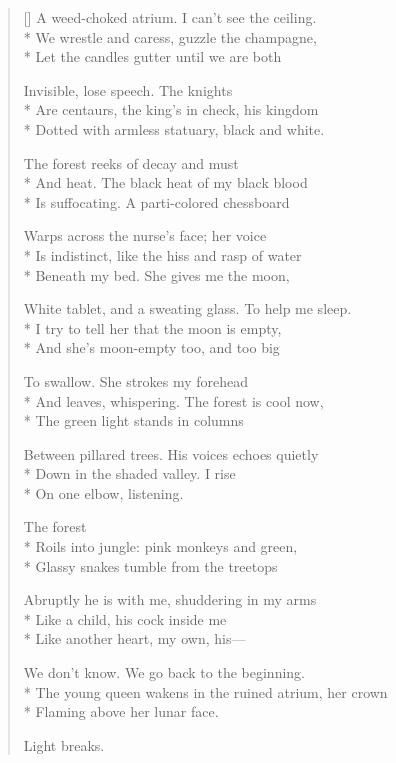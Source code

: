 \begin{verse}[\versewidth]
A weed-choked atrium.  I can't see the ceiling.\\*
We wrestle and caress, guzzle the champagne,\\*
Let the candles gutter until we are both

Invisible, lose speech. The knights\\*
Are centaurs, the king's in check, his kingdom\\*
Dotted with armless statuary, black and white.

The forest reeks of decay and must\\*
And heat. The black heat of my black blood\\*
Is suffocating.  A parti-colored chessboard   

Warps across the nurse's face; her voice\\*
Is indistinct, like the hiss and rasp of water\\*
Beneath my bed.  She gives me the moon,

White tablet, and a sweating glass. To help me sleep.\\*
I try to tell her that the moon is empty,\\*
And she's moon-empty too, and too big

To swallow. She strokes my forehead\\*
And leaves, whispering.  The forest is cool now,\\*
The green light stands in columns

Between pillared trees.  His voices echoes quietly\\*
Down in the shaded valley.  I rise \\*
On one elbow, listening.

\hspace{4\vgap} The forest\\*
Roils into jungle: pink monkeys and green,\\*
Glassy snakes tumble from the treetops

Abruptly he is with me, shuddering in my arms\\*
Like a child, his cock inside me\\*
Like another heart, my own, his---

We don't know.  We go back to the beginning.\\*
The young queen wakens in the ruined atrium, her crown\\*
Flaming above her lunar face.

Light breaks.
\end{verse}
